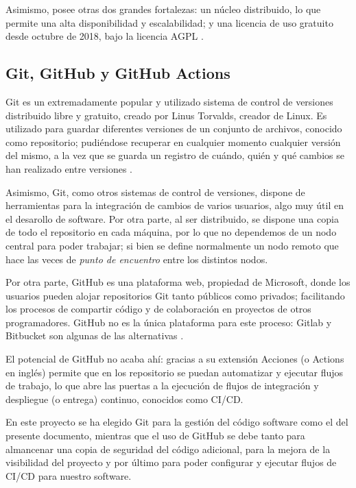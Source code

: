             Asimismo, posee otras dos grandes fortalezas: un núcleo distribuido, lo que permite una alta disponibilidad
            y escalabilidad; y una licencia de uso gratuito desde octubre de 2018, bajo la licencia AGPL 
            \cite{noauthor_que_nodate}.
    \subsection{Git, GitHub y GitHub Actions}
        Git es un extremadamente popular y utilizado sistema de control de versiones distribuido libre y gratuito,
        creado por Linus Torvalds, creador de Linux. Es utilizado para guardar diferentes versiones
        de un conjunto de archivos, conocido como repositorio; pudiéndose recuperar en cualquier momento
        cualquier versión del mismo, a la vez que se guarda un registro de cuándo, quién y qué cambios se han 
        realizado entre versiones \cite{atlassian_software_nodate}.

        Asimismo, Git, como otros sistemas de control de versiones, dispone de herramientas para la integración de
        cambios de varios usuarios, algo muy útil en el desarollo de software. Por otra parte, al ser distribuido,
        se dispone una copia de todo el repositorio en cada máquina, por lo que no dependemos de un nodo central
        para poder trabajar; si bien se define normalmente un nodo remoto que hace las veces de \textit{punto de
        encuentro} entre los distintos nodos. 

        Por otra parte, GitHub es una plataforma web, propiedad de Microsoft, donde los usuarios pueden alojar
        repositorios Git tanto públicos como privados; facilitando los procesos de compartir código y de 
        colaboración en proyectos de otros programadores. GitHub no es la única plataforma para este proceso: Gitlab
        y Bitbucket son algunas de las alternativas \cite{noauthor_git_2021}. 

        El potencial de GitHub no acaba ahí: gracias a su extensión Acciones (o Actions en inglés) permite que en
        los repositorio se puedan automatizar y ejecutar flujos de trabajo, lo que abre las puertas a la ejecución
        de flujos de integración y despliegue (o entrega) continuo, conocidos como CI/CD.

        En este proyecto se ha elegido Git para la gestión del código software como el del presente documento,
        mientras que el uso de GitHub se debe tanto para almancenar una copia de seguridad del código adicional, 
        para la mejora de la visibilidad del proyecto y por último para poder configurar y ejecutar flujos de CI/CD
        para nuestro software.